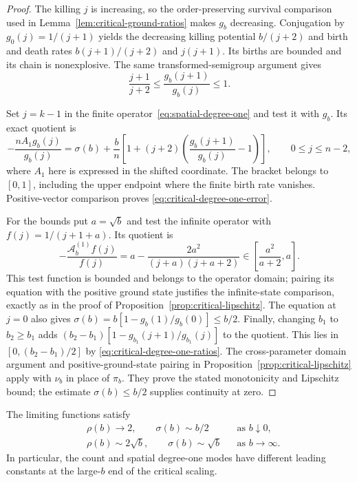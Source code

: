\begin{proof}
The killing $j$ is increasing, so the order-preserving survival
comparison used in Lemma~\ref{lem:critical-ground-ratios} makes $g_b$
decreasing.  Conjugation by $g_0(j)=1/(j+1)$ yields the decreasing
killing potential $b/(j+2)$ and birth and death rates
$b(j+1)/(j+2)$ and $j(j+1)$.  Its births are bounded and its chain
is nonexplosive.  The same transformed-semigroup argument gives
\begin{equation}\label{eq:critical-degree-one-ratios}
 \frac{j+1}{j+2}\leq\frac{g_b(j+1)}{g_b(j)}\leq1.
\end{equation}

Set $j=k-1$ in the finite operator~\eqref{eq:spatial-degree-one}
and test it with $g_b$.  Its exact quotient is
\[
 -\frac{nA_1g_b(j)}{g_b(j)}
 =\sigma(b)+\frac bn
   \left[1+(j+2)\left(\frac{g_b(j+1)}{g_b(j)}-1\right)\right],
 \qquad 0\leq j\leq n-2,
\]
where $A_1$ here is expressed in the shifted coordinate.
The bracket belongs to $[0,1]$, including the upper endpoint where
the finite birth rate vanishes.  Positive-vector comparison proves
\eqref{eq:critical-degree-one-error}.

For the bounds put $a=\sqrt b$ and test the infinite operator with
$f(j)=1/(j+1+a)$.  Its quotient is
\[
 -\frac{\mathcal A_b^{(1)}f(j)}{f(j)}
 =a-\frac{2a^2}{(j+a)(j+a+2)}
 \in\left[\frac{a^2}{a+2},a\right].
\]
This test function is bounded and belongs to the operator domain;
pairing its equation with the positive ground state justifies the
infinite-state comparison, exactly as in the proof of
Proposition~\ref{prop:critical-lipschitz}.  The equation at $j=0$
also gives
$\sigma(b)=b[1-g_b(1)/g_b(0)]\leq b/2$.
Finally, changing $b_1$ to $b_2\geq b_1$ adds
$(b_2-b_1)[1-g_{b_1}(j+1)/g_{b_1}(j)]$ to the quotient.  This lies
in $[0,(b_2-b_1)/2]$ by
\eqref{eq:critical-degree-one-ratios}.  The cross-parameter domain
argument and positive-ground-state pairing in
Proposition~\ref{prop:critical-lipschitz} apply with $\nu_b$ in
place of $\pi_b$.  They prove the stated monotonicity and Lipschitz
bound; the estimate $\sigma(b)\leq b/2$ supplies continuity at zero.
\end{proof}

\begin{corollary}
\label{cor:critical-end-asymptotics}
The limiting functions satisfy
\begin{equation}\label{eq:critical-end-asymptotics}
 \begin{aligned}
 &\rho(b)\longrightarrow2,\qquad
   \sigma(b)\sim b/2 &&\text{as }b\downarrow0,\\
 &\rho(b)\sim2\sqrt b,\qquad
   \sigma(b)\sim\sqrt b &&\text{as }b\longrightarrow\infty.
 \end{aligned}
\end{equation}
In particular, the count and spatial degree-one modes have different
leading constants at the large-$b$ end of the critical scaling.
\end{corollary}

